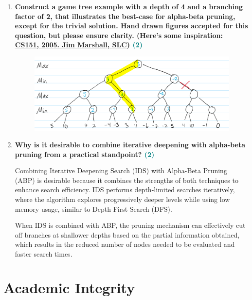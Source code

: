 \documentclass[a4paper]{article}
\begin{document}
\begin{sloppypar}
\begin{enumerate}[start=12,label=Q\arabic*,left=0pt]
    \item \textbf{Construct a game tree example with a depth of 4 and a branching factor of 2, that illustrates the best-case for alpha-beta pruning, except for the trivial solution. Hand drawn figures accepted for this question, but please ensure clarity. 
    (Here's some inspiration: \href{https://science.slc.edu/~jmarshall/courses/2005/fall/cs151/lectures/minimax/BestCase.html}{CS151, 2005. Jim Marshall, SLC}) \hfill \textcolor{teal}{(2)}}    
    
    \begin{figure}[H]
        \centering  
        \includegraphics[height=0.2\textheight]{Q12_tree.png}
        \label{fig:Q12_tree}
    \end{figure}

    \item \textbf{Why is it desirable to combine iterative deepening with alpha-beta pruning from a practical standpoint? \hfill \textcolor{teal}{(2)}}
    
    \par Combining Iterative Deepening Search (IDS) with Alpha-Beta Pruning (ABP) is desirable because it combines the strengths 
    of both techniques to enhance search efficiency. IDS performs depth-limited searches iteratively, where the algorithm explores 
    progressively deeper levels while using low memory usage, similar to Depth-First Search (DFS). 
    
    When IDS is combined with ABP, the pruning mechanism can effectively cut off branches at shallower depths based on the partial 
    information obtained, which results in the reduced number of nodes needed to be evaluated and faster search times.

\end{enumerate}

\section{Academic Integrity}


\end{sloppypar}
\end{document}
